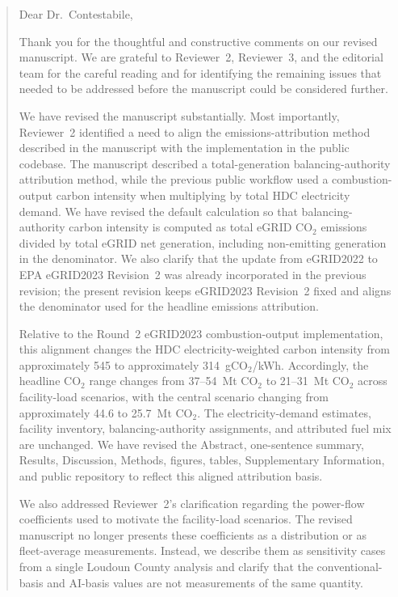 \documentclass[11pt]{article}
\begin{document}
\begin{quote}
Dear Dr.\ Contestabile,

Thank you for the thoughtful and constructive comments on our revised manuscript. We are grateful to Reviewer~2, Reviewer~3, and the editorial team for the careful reading and for identifying the remaining issues that needed to be addressed before the manuscript could be considered further.

We have revised the manuscript substantially. Most importantly, Reviewer~2 identified a need to align the emissions-attribution method described in the manuscript with the implementation in the public codebase. The manuscript described a total-generation balancing-authority attribution method, while the previous public workflow used a combustion-output carbon intensity when multiplying by total HDC electricity demand. We have revised the default calculation so that balancing-authority carbon intensity is computed as total eGRID CO$_2$ emissions divided by total eGRID net generation, including non-emitting generation in the denominator. We also clarify that the update from eGRID2022 to EPA eGRID2023 Revision~2 was already incorporated in the previous revision; the present revision keeps eGRID2023 Revision~2 fixed and aligns the denominator used for the headline emissions attribution.

Relative to the Round~2 eGRID2023 combustion-output implementation, this alignment changes the HDC electricity-weighted carbon intensity from approximately 545 to approximately 314~gCO$_2$/kWh. Accordingly, the headline CO$_2$ range changes from 37--54~Mt CO$_2$ to 21--31~Mt CO$_2$ across facility-load scenarios, with the central scenario changing from approximately 44.6 to 25.7~Mt CO$_2$. The electricity-demand estimates, facility inventory, balancing-authority assignments, and attributed fuel mix are unchanged. We have revised the Abstract, one-sentence summary, Results, Discussion, Methods, figures, tables, Supplementary Information, and public repository to reflect this aligned attribution basis.

We also addressed Reviewer~2's clarification regarding the power-flow coefficients used to motivate the facility-load scenarios. The revised manuscript no longer presents these coefficients as a distribution or as fleet-average measurements. Instead, we describe them as sensitivity cases from a single Loudoun County analysis and clarify that the conventional-basis and AI-basis values are not measurements of the same quantity.


\end{quote}
\end{document}
